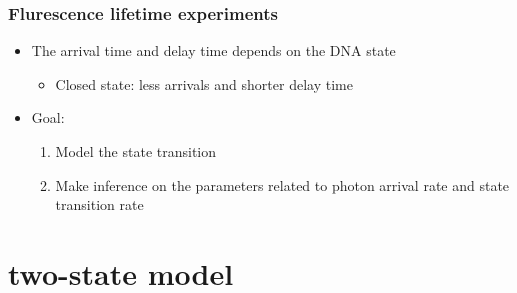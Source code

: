 \documentclass[11pt]{beamer}
\newcommand{\bit}{\begin{itemize}\setlength{\itemsep}{0cm}\setlength{\topsep}{0cm}}
\newcommand{\eit}{\end{itemize}}
\newcommand{\benum}{\begin{enumerate}\setlength{\itemsep}{0cm}\setlength{\parsep
}{0cm}}
\newcommand{\eenum}{\end{enumerate}}
\begin{document}
{

}
\begin{frame}
\frametitle{Flurescence lifetime experiments}
\bit
\item The arrival time and delay time depends on the DNA state
\bit
\item Closed state: less arrivals and shorter delay time 
\eit
\item Goal:
\benum
\item Model the state transition
\item Make inference on the parameters related to photon arrival rate and state transition rate 
\eenum
\eit
\end{frame}
\section{two-state model}
\end{document}
